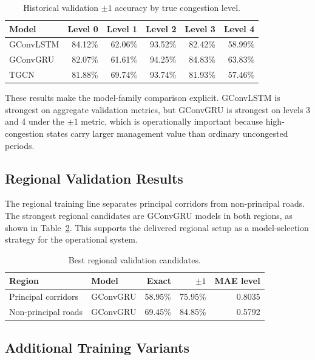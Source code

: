 \documentclass[11pt, a4paper]{article}
\begin{document}
\begin{table}[htbp]
\centering
\caption{Historical validation $\pm1$ accuracy by true congestion level.}
\label{tab:global-validation-levels}
{%
\begin{tabular}{lrrrrr}
\hline
Model & Level 0 & Level 1 & Level 2 & Level 3 & Level 4 \\
\hline
GConvLSTM & 84.12\% & 62.06\% & 93.52\% & 82.42\% & 58.99\% \\
GConvGRU & 82.07\% & 61.61\% & 94.25\% & 84.83\% & 63.83\% \\
TGCN & 81.88\% & 69.74\% & 93.74\% & 81.93\% & 57.46\% \\
\hline
\end{tabular}%
}
\end{table}

These results make the model-family comparison explicit. GConvLSTM is strongest on aggregate validation metrics, but GConvGRU is strongest on levels 3 and 4 under the $\pm1$ metric, which is operationally important because high-congestion states carry larger management value than ordinary uncongested periods.

\subsection{Regional Validation Results}

The regional training line separates principal corridors from non-principal roads. The strongest regional candidates are GConvGRU models in both regions, as shown in Table~\ref{tab:regional-validation-summary}. This supports the delivered regional setup as a model-selection strategy for the operational system.

\begin{table}[htbp]
\centering
\caption{Best regional validation candidates.}
\label{tab:regional-validation-summary}
\begin{tabular}{llrrr}
\hline
Region & Model & Exact & $\pm1$ & MAE level \\
\hline
Principal corridors & GConvGRU & 58.95\% & 75.95\% & 0.8035 \\
Non-principal roads & GConvGRU & 69.45\% & 84.85\% & 0.5792 \\
\hline
\end{tabular}
\end{table}

\subsection{Additional Training Variants}
\end{document}
